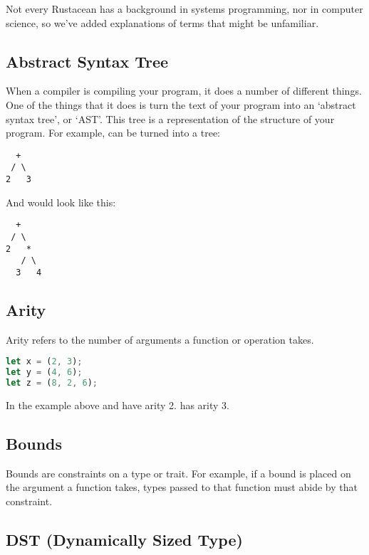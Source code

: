 Not every Rustacean has a background in systems programming, nor in computer science, so we've added explanations of terms that might be 
unfamiliar.

\subsection*{Abstract Syntax Tree}
\label{sec:gloss_syntaxtree}

When a compiler is compiling your program, it does a number of different things. One of the things that it does is turn 
the text of your program into an ‘abstract syntax tree’, or ‘AST’. This tree is a representation of the structure of your 
program. For example,  can be turned into a tree:

\begin{lstlisting}
  +
 / \
2   3
\end{lstlisting}

And  would look like this:

\begin{lstlisting}
  +
 / \
2   *
   / \
  3   4
\end{lstlisting}

\subsection*{Arity}
\label{sec:gloss_arity}

Arity refers to the number of arguments a function or operation takes.

\begin{lstlisting}[language=Rust]
let x = (2, 3);
let y = (4, 6);
let z = (8, 2, 6);
\end{lstlisting}

In the example above  and  have arity 2.  has arity 3.

\subsection*{Bounds}
\label{sec:gloss_bounds}

Bounds are constraints on a type or trait. For example, if a bound is placed on the argument a function takes, 
types passed to that function must abide by that constraint.

\subsection*{DST (Dynamically Sized Type)}
\label{sec:gloss_dst}

